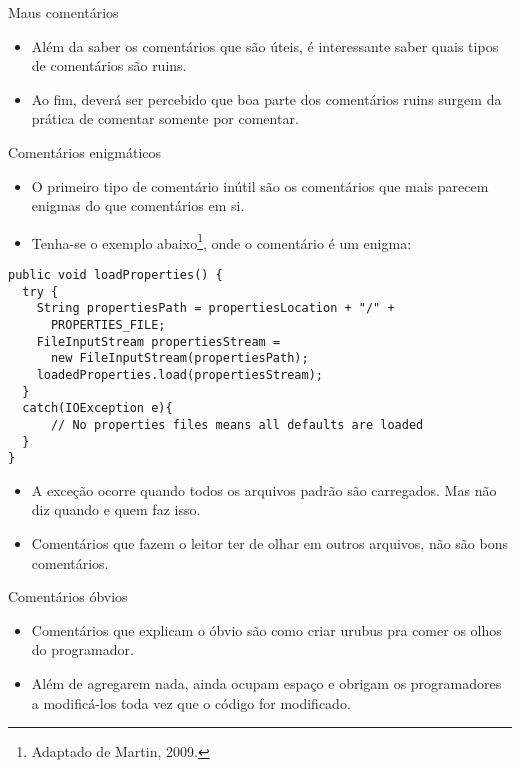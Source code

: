 \documentclass[11pt]{beamer}
\begin{document}
  \begin{frame}{Maus comentários}
    \begin{itemize}
      \item Além da saber os comentários que são úteis, é interessante saber quais tipos de comentários são ruins.
      \item Ao fim, deverá ser percebido que boa parte dos comentários ruins surgem da prática de comentar somente por comentar.
    \end{itemize}
  \end{frame}

  \begin{frame}[fragile]{Comentários enigmáticos}
    \begin{itemize}
      \item O primeiro tipo de comentário inútil são os comentários que mais parecem enigmas do que comentários em si.
      \item Tenha-se o exemplo abaixo\footnote{Adaptado de Martin, 2009.}, onde o comentário é um enigma: 
    \end{itemize}
    \begin{lstlisting}[basicstyle=\tiny]
public void loadProperties() {
  try {
    String propertiesPath = propertiesLocation + "/" +
      PROPERTIES_FILE;
    FileInputStream propertiesStream = 
      new FileInputStream(propertiesPath);
    loadedProperties.load(propertiesStream);
  }
  catch(IOException e){
      // No properties files means all defaults are loaded
  }
}
    \end{lstlisting}
    \begin{itemize}
      \item A exceção ocorre quando todos os arquivos padrão são carregados. Mas não diz quando e quem faz isso.
      \item Comentários que fazem o leitor ter de olhar em outros arquivos, não são bons comentários.
    \end{itemize}
  \end{frame}

  \begin{frame}{Comentários óbvios}
    \begin{itemize}
      \item Comentários que explicam o óbvio são como criar urubus pra comer os olhos do programador.
      \item Além de agregarem nada, ainda ocupam espaço e obrigam os programadores a modificá-los toda vez que o código for modificado.
    \end{itemize}
  \end{frame}
\end{document}
